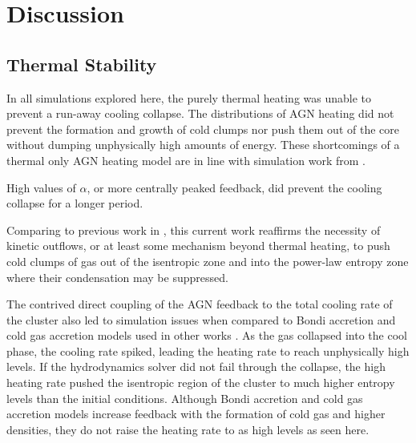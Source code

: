 \documentclass[iop,apjl, twocolappendix]{emulateapj}   %
\begin{document}

\section{Discussion}
\label{sec:discussion}

\subsection{Thermal Stability}
\label{sec:thermal_stability}

In all simulations explored here, the purely thermal heating was unable to
prevent a run-away cooling collapse. The distributions of AGN heating did not
prevent the formation and growth of cold clumps nor push them out of the core
without dumping unphysically high amounts of energy. These shortcomings of a
thermal only AGN heating model are in line with simulation work from
\citep{gaspari_agn_2011,meece_triggering_2017}.

High values of $\alpha$, or more centrally peaked feedback, did prevent the
cooling collapse for a longer period. 

Comparing to previous work in \citep{gaspari_agn_2011,meece_triggering_2017},
this current work reaffirms the necessity of kinetic outflows, or at least some
mechanism beyond thermal heating, to push cold clumps of gas out of the
isentropic zone and into the power-law entropy zone where their condensation
may be suppressed.

The contrived direct coupling of the AGN feedback to the total cooling rate of
the cluster also led to simulation issues when compared to Bondi accretion and
cold gas accretion models used in other works \cite{meece_triggering_2017}. As
the gas collapsed into the cool phase, the cooling rate spiked, leading the
heating rate to reach unphysically high levels. If the hydrodynamics solver did
not fail through the collapse, the high heating rate pushed the isentropic
region of the cluster to much higher entropy levels than the initial
conditions. Although Bondi accretion and cold gas accretion models increase
feedback with the formation of cold gas and higher densities, they do not raise
the heating rate to as high levels as seen here.
\end{document}
